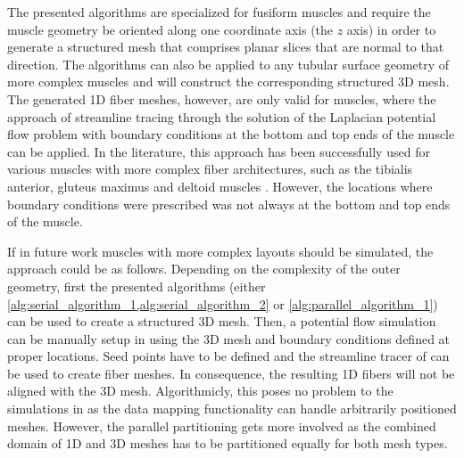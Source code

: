 The presented algorithms are specialized for fusiform muscles and require the muscle geometry be oriented along one coordinate axis (the $z$ axis) in order to generate a structured mesh  that comprises planar slices that are normal to that direction.
The algorithms can also be applied to any tubular surface geometry of more complex muscles and will construct the corresponding structured 3D mesh. The generated 1D fiber meshes, however, are only valid for muscles, where the approach of streamline tracing through the solution of the Laplacian potential flow problem with boundary conditions at the bottom and top ends of the muscle can be applied.
In the literature, this approach has been successfully used for various muscles with more complex fiber architectures, such as the tibialis anterior, gluteus maximus and deltoid muscles \cite{Choi2013}. However, the locations where boundary conditions were prescribed was not always at the bottom and top ends of the muscle.

If in future work muscles with more complex layouts should be simulated, the approach could be as follows. Depending on the complexity of the outer geometry, first the presented algorithms (either \cref{alg:serial_algorithm_1,alg:serial_algorithm_2} or \cref{alg:parallel_algorithm_1}) can be used to create a structured 3D mesh. Then, a potential flow simulation can be manually setup in \opendihu{} using the 3D mesh and boundary conditions defined at proper locations. Seed points have to be defined and the streamline tracer of \opendihu{} can be used to create fiber meshes. In consequence, the resulting 1D fibers will not be aligned with the 3D mesh. Algorithmicly, this poses no problem to the simulations in \opendihu{} as the data mapping functionality can handle arbitrarily positioned meshes. However, the parallel partitioning gets more involved as the combined domain of 1D and 3D meshes has to be partitioned equally for both mesh types.

